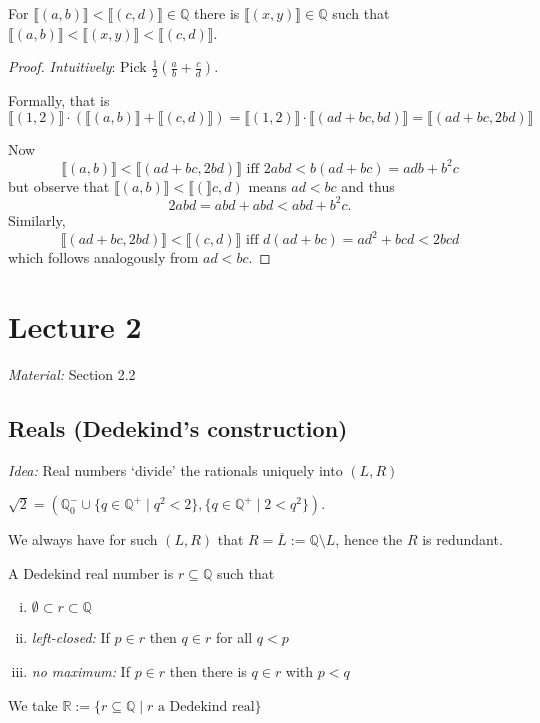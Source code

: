 \documentclass{whrartcl}
\newcommand{\QQ}{\mathbb{Q}}
\newcommand{\RR}{\mathbb{R}}
\newcommand{\ol}[1]{\overline{#1}}
\newcommand{\cls}[1]{\llbracket #1 \rrbracket}
\begin{document}
\begin{theorem}[Density]
  For $\cls{(a, b)} < \cls{(c, d)} \in \QQ$ there is $\cls{(x,y)} \in \QQ$ such
  that $\cls{(a, b)} < \cls{(x, y)} < \cls{(c, d)}$.
\end{theorem}
\begin{proof}
  \emph{Intuitively}: Pick $\frac 1 2 (\frac a b + \frac c d)$.

  Formally, that is
  \[
    \cls{(1, 2)} \cdot (\cls{(a, b)} + \cls{(c, d)}) = \cls{(1, 2)} \cdot
    \cls{(ad + bc, bd)} = \cls{(ad + bc, 2bd)}
  \]

  Now
  \[
    \cls{(a, b)} < \cls{(ad + bc, 2bd)} \text{ iff } 2abd < b(ad + bc) = adb + b^2c
  \]
  but observe that $\cls{(a, b)} < \cls(c, d)$ means $ad < bc$ and thus
  \[
    2abd = abd + abd < abd + b^2c.
  \]
  Similarly,
  \[
    \cls{(ad + bc, 2bd)} < \cls{(c, d)} \text{ iff } d(ad + bc) = ad^2 + bcd < 2bcd
  \]
  which follows analogously from $ad < bc$.
\end{proof}

\newpage

\section{Lecture 2}

\emph{Material:} Section 2.2

\subsection{Reals (Dedekind's construction)}

\emph{Idea:} Real numbers `divide' the rationals uniquely into $(L, R)$

\begin{example}
  $\sqrt{2} = (\QQ_0^- \cup \{q \in \QQ^+ \mid q^2 < 2\}, \{q \in \QQ^+ \mid 2 < q^2 \})$.
\end{example}

\begin{observation}
  We always have for such $(L, R)$ that $R = \ol{L} := \QQ \setminus L$, hence the $R$ is redundant.
\end{observation}

\begin{definition}
  A Dedekind real number is $r \subseteq \QQ$ such that
  \begin{enumerate}[(i)]
  \item $\emptyset \subset r \subset \QQ$
  \item \emph{left-closed:} If $p \in r$ then $q \in r$ for all $q < p$
  \item \emph{no maximum:} If $p \in r$ then there is $q \in r$ with $p < q$
  \end{enumerate}
  We take $\RR := \{r \subseteq \QQ \mid r \text{ a Dedekind real}\}$
\end{definition}
\end{document}
